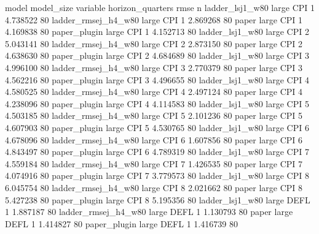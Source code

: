               model model_size variable  horizon_quarters      rmse  n
    ladder_lsj1_w80      large      CPI                 1  4.738522 80
ladder_rmsej_h4_w80      large      CPI                 1  2.869268 80
              paper      large      CPI                 1  4.169838 80
       paper_plugin      large      CPI                 1  4.152713 80
    ladder_lsj1_w80      large      CPI                 2  5.043141 80
ladder_rmsej_h4_w80      large      CPI                 2  2.873150 80
              paper      large      CPI                 2  4.638630 80
       paper_plugin      large      CPI                 2  4.684689 80
    ladder_lsj1_w80      large      CPI                 3  4.996100 80
ladder_rmsej_h4_w80      large      CPI                 3  2.770379 80
              paper      large      CPI                 3  4.562216 80
       paper_plugin      large      CPI                 3  4.496655 80
    ladder_lsj1_w80      large      CPI                 4  4.580525 80
ladder_rmsej_h4_w80      large      CPI                 4  2.497124 80
              paper      large      CPI                 4  4.238096 80
       paper_plugin      large      CPI                 4  4.114583 80
    ladder_lsj1_w80      large      CPI                 5  4.503185 80
ladder_rmsej_h4_w80      large      CPI                 5  2.101236 80
              paper      large      CPI                 5  4.607903 80
       paper_plugin      large      CPI                 5  4.530765 80
    ladder_lsj1_w80      large      CPI                 6  4.678096 80
ladder_rmsej_h4_w80      large      CPI                 6  1.607856 80
              paper      large      CPI                 6  4.843497 80
       paper_plugin      large      CPI                 6  4.789319 80
    ladder_lsj1_w80      large      CPI                 7  4.559184 80
ladder_rmsej_h4_w80      large      CPI                 7  1.426535 80
              paper      large      CPI                 7  4.074916 80
       paper_plugin      large      CPI                 7  3.779573 80
    ladder_lsj1_w80      large      CPI                 8  6.045754 80
ladder_rmsej_h4_w80      large      CPI                 8  2.021662 80
              paper      large      CPI                 8  5.427238 80
       paper_plugin      large      CPI                 8  5.195356 80
    ladder_lsj1_w80      large     DEFL                 1  1.887187 80
ladder_rmsej_h4_w80      large     DEFL                 1  1.130793 80
              paper      large     DEFL                 1  1.414827 80
       paper_plugin      large     DEFL                 1  1.416739 80
